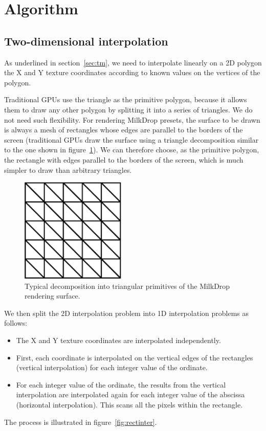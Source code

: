 \documentclass[a4paper,11pt]{kthesis}
\begin{document}
\section{Algorithm}
\subsection{Two-dimensional interpolation}
As underlined in section~\ref{sec:tm}, we need to interpolate linearly on a 2D polygon the X and Y texture coordinates according to known values on the vertices of the polygon.

Traditional GPUs use the triangle as the primitive polygon, because it allows them to draw any other polygon by splitting it into a series of triangles. We do not need such flexibility. For rendering MilkDrop presets, the surface to be drawn is always a mesh of rectangles whose edges are parallel to the borders of the screen (traditional GPUs draw the surface using a triangle decomposition similar to the one shown in figure~\ref{fig:tridec}). We can therefore choose, as the primitive polygon, the rectangle with edges parallel to the borders of the screen, which is much simpler to draw than arbitrary triangles.

\begin{figure}[htp]
\centering
\includegraphics[height=50mm]{tridec.eps}
\caption{Typical decomposition into triangular primitives of the MilkDrop rendering surface.}
\label{fig:tridec}
\end{figure}

We then split the 2D interpolation problem into 1D interpolation problems as follows:
\begin{itemize}
\item The X and Y texture coordinates are interpolated independently.
\item First, each coordinate is interpolated on the vertical edges of the rectangles (vertical interpolation) for each integer value of the ordinate.
\item For each integer value of the ordinate, the results from the vertical interpolation are interpolated again for each integer value of the abscissa (horizontal interpolation). This scans all the pixels within the rectangle.
\end{itemize}
The process is illustrated in figure~\ref{fig:rectinter}.
\end{document}
